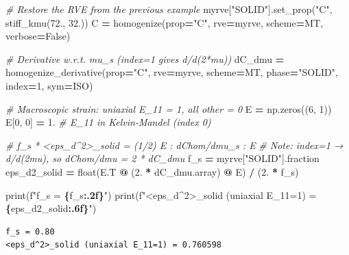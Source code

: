 \documentclass[
  a4paper,
  numbers=noendperiod,
  DIV=12]{scrreprt}
\newenvironment{Shaded}{\begin{snugshade}}{\end{snugshade}}
\newcommand{\BuiltInTok}[1]{#1}
\newcommand{\CommentTok}[1]{\textcolor[rgb]{0.56,0.35,0.01}{\textit{#1}}}
\newcommand{\DecValTok}[1]{\textcolor[rgb]{0.00,0.00,0.81}{#1}}
\newcommand{\FloatTok}[1]{\textcolor[rgb]{0.00,0.00,0.81}{#1}}
\newcommand{\NormalTok}[1]{#1}
\newcommand{\OperatorTok}[1]{\textcolor[rgb]{0.81,0.36,0.00}{\textbf{#1}}}
\newcommand{\SpecialCharTok}[1]{\textcolor[rgb]{0.81,0.36,0.00}{\textbf{#1}}}
\newcommand{\SpecialStringTok}[1]{\textcolor[rgb]{0.31,0.60,0.02}{#1}}
\newcommand{\StringTok}[1]{\textcolor[rgb]{0.31,0.60,0.02}{#1}}
\newcommand{\VariableTok}[1]{\textcolor[rgb]{0.00,0.00,0.00}{#1}}
\begin{document}
\begin{Shaded}
\begin{Highlighting}[]
\CommentTok{\# Restore the RVE from the previous example}
\NormalTok{myrve[}\StringTok{"SOLID"}\NormalTok{].set\_prop(}\StringTok{"C"}\NormalTok{, stiff\_kmu(}\FloatTok{72.}\NormalTok{, }\FloatTok{32.}\NormalTok{))}
\NormalTok{C }\OperatorTok{=}\NormalTok{ homogenize(prop}\OperatorTok{=}\StringTok{"C"}\NormalTok{, rve}\OperatorTok{=}\NormalTok{myrve, scheme}\OperatorTok{=}\NormalTok{MT, verbose}\OperatorTok{=}\VariableTok{False}\NormalTok{)}

\CommentTok{\# Derivative w.r.t. mu\_s  (index=1 gives d/d(2*mu))}
\NormalTok{dC\_dmu }\OperatorTok{=}\NormalTok{ homogenize\_derivative(prop}\OperatorTok{=}\StringTok{"C"}\NormalTok{, rve}\OperatorTok{=}\NormalTok{myrve, scheme}\OperatorTok{=}\NormalTok{MT,}
\NormalTok{                                phase}\OperatorTok{=}\StringTok{"SOLID"}\NormalTok{, index}\OperatorTok{=}\DecValTok{1}\NormalTok{, sym}\OperatorTok{=}\NormalTok{ISO)}

\CommentTok{\# Macroscopic strain: uniaxial E\_11 = 1, all other = 0}
\NormalTok{E }\OperatorTok{=}\NormalTok{ np.zeros((}\DecValTok{6}\NormalTok{, }\DecValTok{1}\NormalTok{))}
\NormalTok{E[}\DecValTok{0}\NormalTok{, }\DecValTok{0}\NormalTok{] }\OperatorTok{=} \FloatTok{1.}   \CommentTok{\# E\_11 in Kelvin{-}Mandel (index 0)}

\CommentTok{\# f\_s * \textless{}eps\_d\^{}2\textgreater{}\_solid = (1/2) E : dChom/dmu\_s : E}
\CommentTok{\# Note: index=1 → d/d(2mu), so dChom/dmu = 2 * dC\_dmu}
\NormalTok{f\_s }\OperatorTok{=}\NormalTok{ myrve[}\StringTok{"SOLID"}\NormalTok{].fraction}
\NormalTok{eps\_d2\_solid }\OperatorTok{=} \BuiltInTok{float}\NormalTok{(E.T }\OperatorTok{@}\NormalTok{ (}\FloatTok{2.} \OperatorTok{*}\NormalTok{ dC\_dmu.array) }\OperatorTok{@}\NormalTok{ E) }\OperatorTok{/}\NormalTok{ (}\FloatTok{2.} \OperatorTok{*}\NormalTok{ f\_s)}

\BuiltInTok{print}\NormalTok{(}\SpecialStringTok{f"f\_s = }\SpecialCharTok{\{}\NormalTok{f\_s}\SpecialCharTok{:.2f\}}\SpecialStringTok{"}\NormalTok{)}
\BuiltInTok{print}\NormalTok{(}\SpecialStringTok{f"\textless{}eps\_d\^{}2\textgreater{}\_solid (uniaxial E\_11=1) = }\SpecialCharTok{\{}\NormalTok{eps\_d2\_solid}\SpecialCharTok{:.6f\}}\SpecialStringTok{"}\NormalTok{)}
\end{Highlighting}
\end{Shaded}

\begin{verbatim}
f_s = 0.80
<eps_d^2>_solid (uniaxial E_11=1) = 0.760598
\end{verbatim}
\end{document}
